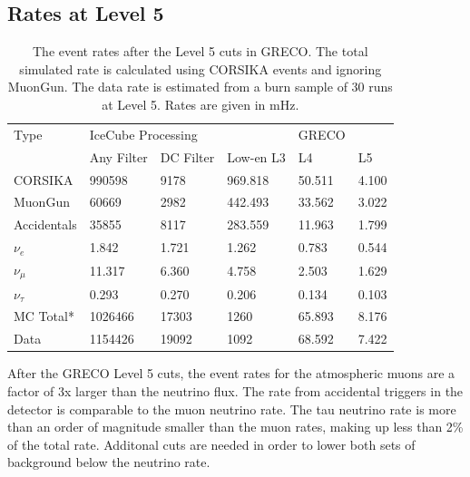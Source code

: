 \subsection{Rates at Level 5}
\begin{table}[]
\centering
\begin{tabular}{@{}llllll@{}}
\toprule
Type         & \multicolumn{3}{l}{IceCube Processing} & GRECO  &       \\
             & Any Filter   & DC Filter  & Low-en L3  & L4     & L5    \\ \midrule
CORSIKA      & 990598       & 9178       & 969.818    & 50.511 & 4.100 \\
MuonGun      & 60669        & 2982       & 442.493    & 33.562 & 3.022 \\
Accidentals  & 35855        & 8117       & 283.559    & 11.963 & 1.799 \\
$\nu_e$      & 1.842        & 1.721      & 1.262      & 0.783  & 0.544 \\
$\nu_{\mu}$  & 11.317       & 6.360      & 4.758      & 2.503  & 1.629 \\
$\nu_{\tau}$ & 0.293        & 0.270      & 0.206      & 0.134  & 0.103 \\ \midrule
MC Total*    & 1026466      & 17303      & 1260       & 65.893 & 8.176 \\
Data         & 1154426      & 19092      & 1092       & 68.592 & 7.422 \\ \bottomrule
\end{tabular}
\caption{The event rates after the Level 5 cuts in GRECO.  The total simulated rate is calculated using CORSIKA events and ignoring MuonGun. The data rate is estimated from a burn sample of 30 runs at Level 5. Rates are given in mHz.}
\label{tab:event_rates_L5}
\end{table}

After the GRECO Level 5 cuts, the event rates for the atmospheric muons are a factor of 3x larger than the neutrino flux. 
The rate from accidental triggers in the detector is comparable to the muon neutrino rate.
The tau neutrino rate is more than an order of magnitude smaller than the muon rates, making up less than 2\% of the total rate.
Additonal cuts are needed in order to lower both sets of background below the neutrino rate.
















